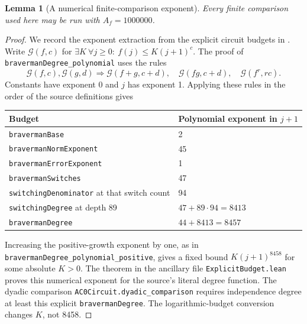 \documentclass[11pt]{article}
\newtheorem{lemma}[theorem]{Lemma}
\theoremstyle{definition}
\newcommand{\leanname}[1]{\nolinkurl{#1}}
\begin{document}
\begin{lemma}[A numerical finite-comparison exponent]\label{lem:explicitA}
Every finite comparison used here may be run with $A_f=1000000$.
\end{lemma}
\begin{proof}
We record the exponent extraction from the explicit circuit budgets in
\cite{OpenAIMath}. Write $\mathcal G(f,c)$ for
$\exists K\ \forall j\ge0:\ f(j)\le K(j+1)^c$.
The proof of \leanname{bravermanDegree_polynomial} uses the rules
\[
 \mathcal G(f,c),\mathcal G(g,d)
 \Longrightarrow\mathcal G(f+g,c+d),\quad
 \mathcal G(fg,c+d),\quad\mathcal G(f^r,rc).
\]
Constants have exponent 0 and $j$ has exponent 1.
Applying these rules in the order of the source definitions gives
\begin{center}
\begin{tabular}{@{}p{}p{}@{}}
\toprule
Budget & Polynomial exponent in $j+1$\\
\midrule
\leanname{bravermanBase} & 2\\
\leanname{bravermanNormExponent} & 45\\
\leanname{bravermanErrorExponent} & 1\\
\leanname{bravermanSwitches} & 47\\
\leanname{switchingDenominator} at that switch count & 94\\
\leanname{switchingDegree} at depth 89 & $47+89\cdot94=8413$\\
\leanname{bravermanDegree} & $44+8413=8457$\\
\bottomrule
\end{tabular}
\end{center}
Increasing the positive-growth exponent by one, as in
\leanname{bravermanDegree_polynomial_positive}, gives a fixed bound
$K(j+1)^{8458}$ for some absolute $K>0$.
The theorem
in the ancillary file \texttt{ExplicitBudget.lean} proves this numerical exponent
for the source's literal degree function.
The dyadic comparison
\leanname{AC0Circuit.dyadic_comparison} requires independence degree
at least this explicit \leanname{bravermanDegree}.
The logarithmic-budget conversion changes $K$, not 8458.


\end{proof}
\end{document}
